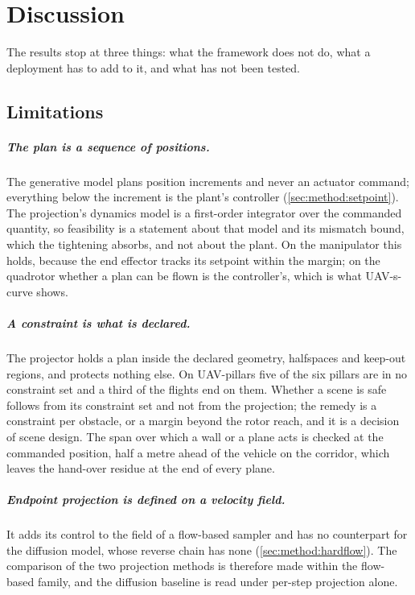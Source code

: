 \chapter{Discussion}\label{ch:discussion}

The results stop at three things: what the framework does not do, what a deployment has to add to it,
and what has not been tested.

\section{Limitations}\label{sec:disc:limitations}

\paragraph{The plan is a sequence of positions.} The generative model plans position increments and
never an actuator command; everything below the increment is the plant's controller
(\autoref{sec:method:setpoint}). The projection's dynamics model is a first-order integrator over the
commanded quantity, so feasibility is a statement about that model and its mismatch bound, which the
tightening absorbs, and not about the plant. On the manipulator this holds, because the end effector
tracks its setpoint within the margin; on the quadrotor whether a plan can be flown is the
controller's, which is what UAV-s-curve shows.

\paragraph{A constraint is what is declared.} The projector holds a plan inside the declared geometry,
halfspaces and keep-out regions, and protects nothing else. On UAV-pillars five of the six pillars are
in no constraint set and a third of the flights end on them. Whether a scene is safe follows from its
constraint set and not from the projection; the remedy is a constraint per obstacle, or a margin beyond
the rotor reach, and it is a decision of scene design. The span over which a wall or a plane acts is
checked at the commanded position, half a metre ahead of the vehicle on the corridor, which leaves the
hand-over residue at the end of every plane.

\paragraph{Endpoint projection is defined on a velocity field.} It adds its control to the field of a
flow-based sampler and has no counterpart for the diffusion model, whose reverse chain has none
(\autoref{sec:method:hardflow}). The comparison of the two projection methods is therefore made within
the flow-based family, and the diffusion baseline is read under per-step projection alone.

